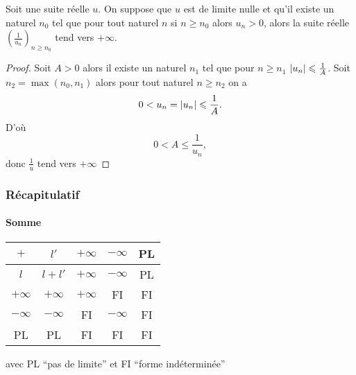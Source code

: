 \begin{prop}
  Soit une suite réelle $u$. On suppose que $u$ est de limite nulle et qu'il existe un naturel $n_0$ tel que pour tout naturel $n$ si $n \geqslant n_0$ alors $u_n > 0$, alors la suite réelle $\left(\frac{1}{u_n}\right)_{n \geqslant n_0}$ tend vers $+\infty$.
\end{prop}
\begin{proof}
  Soit $A>0$ alors il existe un naturel $n_1$ tel que pour $n \geqslant n_1$ $\left\lvert u_n\right\rvert \leqslant \frac{1}{A}$. Soit $n_2=\max(n_0,n_1)$ alors pour tout naturel $n \geqslant n_2$ on a
  \begin{equation}
    0 < u_n=\left\lvert u_n\right\rvert \leqslant \frac{1}{A}.
  \end{equation}
  D'où
  \begin{equation}
    0 < A \leqslant \frac{1}{u_n},
  \end{equation}
  donc $\frac{1}{u}$ tend vers $+\infty$
\end{proof}

\subsubsection{Récapitulatif}

\paragraph{Somme}

\begin{center}
  \begin{tabular}{|c|c|c|c|c|}\hline
    $+$ & $l'$ & $+\infty$ & $-\infty$ & PL \\ \hline
    $l$ & $l+l'$ & $+\infty$ & $-\infty$ & PL \\ \hline
    $+\infty$ & $+\infty$ & $+\infty$ & FI & FI \\ \hline
    $-\infty$ & $-\infty$ & FI & $-\infty$ & FI \\ \hline
    PL & PL & FI & FI & FI \\ \hline
  \end{tabular}
\end{center}

avec PL ``pas de limite'' et FI ``forme indéterminée''

